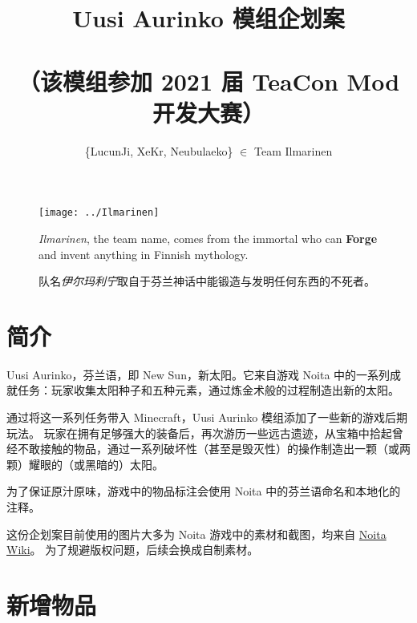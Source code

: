 \documentclass[11pt]{article}
\title{Uusi Aurinko 模组企划案\\
\ \\
\small{（该模组参加 2021 届 TeaCon Mod 开发大赛）}}
\author{\{LucunJi, XeKr, Neubulaeko\} $\in$ Team Ilmarinen}
\begin{document}
    \maketitle
    \begin{figure}[ht!]
        \centering
        \texttt{[image: ../Ilmarinen]}

        \small{\textit{Ilmarinen}, the team name, comes from the immortal who can \textbf{Forge} and invent anything in Finnish mythology.}

        \small{队名\textit{伊尔玛利宁}取自于芬兰神话中能锻造与发明任何东西的不死者。}
        \label{fig:group}
    \end{figure}

    \clearpage
    \tableofcontents

    \clearpage
    \section{简介}\label{sec:intro}
    Uusi Aurinko，芬兰语，即 New Sun，新太阳。它来自游戏 Noita 中的一系列成就任务：玩家收集太阳种子和五种元素，通过炼金术般的过程制造出新的太阳。

    通过将这一系列任务带入 Minecraft，Uusi Aurinko 模组添加了一些新的游戏后期玩法。
    玩家在拥有足够强大的装备后，再次游历一些远古遗迹，从宝箱中拾起曾经不敢接触的物品，通过一系列破坏性（甚至是毁灭性）的操作制造出一颗（或两颗）耀眼的（或黑暗的）太阳。

    为了保证原汁原味，游戏中的物品标注会使用 Noita 中的芬兰语命名和本地化的注释。

    \vspace{1em}
    这份企划案目前使用的图片大多为 Noita 游戏中的素材和截图，均来自 \href{https://noita.wiki.gg/wiki/Noita_Wiki}{Noita Wiki}。
    为了规避版权问题，后续会换成自制素材。

    \clearpage
    \section{新增物品}\label{sec:new-items}
\end{document}
